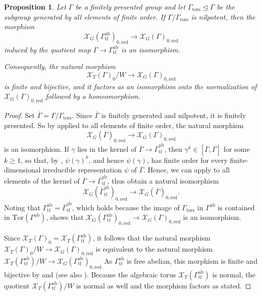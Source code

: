 \documentclass[11pt, a4paper]{amsart}
\newtheorem{proposition}[theorem]{Proposition}
\theoremstyle{definition}
\theoremstyle{myitemstyle}
\newcommand{\red}{{\mathrm{red}}}
\newcommand{\mc}[1]{{\mathcal{#1}}}
\newcommand{\ab}{\mathrm{ab}}
\newcommand{\tf}{\mathrm{tf}}
\begin{document}
\begin{proposition}\label{prop:nilpotent-mod-torsion for character varieties}
Let $\Gamma$ be a finitely presented group and let $\Gamma_{\mathrm{tors}}\trianglelefteq\Gamma$ be the subgroup generated by all elements of finite order. If $\Gamma/\Gamma_{\mathrm{tors}}$ is nilpotent, then the morphism
\[
    \mc X_G(\Gamma^\ab_\tf)_{0,\red}\to \mc X_G(\Gamma)_{0,\red}
\]
induced by the quotient map $\Gamma\to \Gamma^\ab_\tf$ is an isomorphism.

Consequently, the natural morphism
\[
    \mc X_T(\Gamma)_0/W\longrightarrow \mc X_G(\Gamma)_{0,\red}
\]
is finite and bijective, and it factors as an isomorphism onto the normalization of $\mc X_G(\Gamma)_{0,\red}$ followed by a homeomorphism.
\end{proposition}

\begin{proof}
Set $\overline\Gamma=\Gamma/\Gamma_{\mathrm{tors}}$. Since $\overline\Gamma$ is finitely generated and nilpotent, it is finitely presented. So by  applied to all elements of finite order, the natural morphism
\[
    \mc X_G(\overline \Gamma)_{0,\red}\to \mc X_G(\Gamma)_{0,\red}
\]
is an isomorphism. If $\gamma$ lies in the kernel of $\overline\Gamma\to \overline\Gamma^\ab_\tf$, then $\gamma^k\in[\overline\Gamma,\overline\Gamma]$ for some $k\geq1$, so that, by , $\psi(\gamma)^k$, and hence $\psi(\gamma)$, has finite order for every finite-dimensional irreducible representation $\psi$ of $\overline\Gamma$. Hence, we can apply  to all elements of the kernel of $\overline\Gamma\to \overline\Gamma^\ab_\tf$, thus obtain a natural isomorphism
\[
    \mc X_G(\overline \Gamma^\ab_\tf)_{0,\red}\to \mc X_G(\overline\Gamma)_{0,\red}.
\]
Noting that $\Gamma^\ab_\tf=\overline\Gamma^\ab_\tf$, which holds because the image of $\Gamma_{\mathrm{tors}}$ in $\Gamma^\ab$ is contained in $\mathrm{Tor}(\Gamma^\ab)$, shows that 
\(
    \mc X_G(\Gamma^\ab_\tf)_{0,\red}\longrightarrow \mc X_G(\Gamma)_{0,\red}
\)
is an isomorphism.

Since $\mc X_T(\Gamma)_0= \mc X_T(\Gamma^\ab_\tf)$, it follows that the natural morphism 
\(
    \mc X_T(\Gamma)_0/W\longrightarrow \mc X_G(\Gamma)_{0,\red}
\)
is equivalent to the natural morphism
\(
    \mc X_T(\Gamma^\ab_\tf)/W\longrightarrow \mc X_G(\Gamma^\ab_\tf)_{0,\red}
\)
As $\Gamma^\ab_\tf$ is free abelian, this morphism is finite and bijective by \cite[Proposition 7.1]{Sikora} and \cite[Theorem 3.4]{FLS25} (see also \cite{Thaddeus}). Because the algebraic torus $\mc X_T(\Gamma^\ab_\tf)$ is normal, the quotient $\mc X_T(\Gamma^\ab_\tf)/W$ is normal as well and the morphism factors as stated.
\end{proof}
\end{document}
